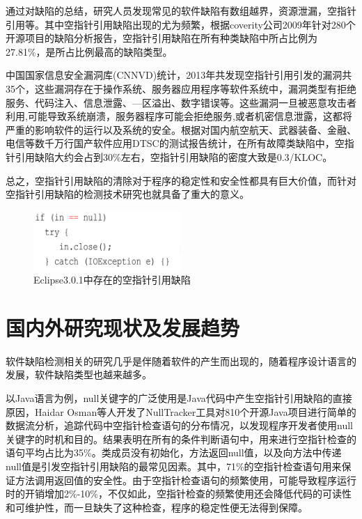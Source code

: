 通过对缺陷的总结，研究人员发现常见的软件缺陷有数组越界，资源泄漏，空指针引用等。其中空指针引用缺陷出现的尤为频繁，根据coverity公司2009年针对280个开源项目的缺陷分析报告，空指针引用缺陷在所有种类缺陷中所占比例为27.81\%，是所占比例最高的缺陷类型\cite{coverity2009}。


中国国家信息安全漏洞库(CNNVD)统计，2013年共发现空指针引用引发的漏洞共35个，这些漏洞存在于操作系统、服务器应用程序等软件系统中，漏洞类型有拒绝服务、代码注入、信息泄露、—区溢出、数字错误等。这些漏洞一旦被恶意攻击者利用,可能导致系统崩溃，服务器程序可能会拒绝服务,或者机密信息泄露，这都将严重的影响软件的运行以及系统的安全。根据对国内航空航天、武器装备、金融、电信等数千万行国产软件应用DTSC的测试报告统计，在所有故障类缺陷中，空指针引用缺陷大约会占到30\%左右，空指针引用缺陷的密度大致是0.3/KLOC。

总之，空指针引用缺陷的清除对于程序的稳定性和安全性都具有巨大价值，而针对空指针引用缺陷的检测技术研究也就具备了重大的意义。
 \begin{figure}
 \centering
 \includegraphics[width=0.50\textwidth]{figures/NullPointer1-1}
 \caption{Eclipse3.0.1中存在的空指针引用缺陷}\label{fig:figure1-1}
\end{figure}

\section{国内外研究现状及发展趋势}

软件缺陷检测相关的研究几乎是伴随着软件的产生而出现的，随着程序设计语言的发展，软件缺陷类型也越来越多。

以Java语言为例，null关键字的广泛使用是Java代码中产生空指针引用缺陷的直接原因，Haidar Osman等人开发了NullTracker\cite{osman2016tracking}工具对810个开源Java项目进行简单的数据流分析，追踪代码中空指针检查语句的分布情况，以发现程序开发者使用null关键字的时机和目的。结果表明在所有的条件判断语句中，用来进行空指针检查的语句平均占比为35\%。类成员没有初始化，方法返回null值，以及向方法中传递null值是引发空指针引用缺陷的最常见因素。其中，71\%的空指针检查语句用来保证方法调用返回值的安全性。由于空指针检查语句的频繁使用，可能导致程序运行时的开销增加2\%-10\%，不仅如此，空指针检查的频繁使用还会降低代码的可读性和可维护性，而一旦缺失了这种检查，程序的稳定性便无法得到保障。

